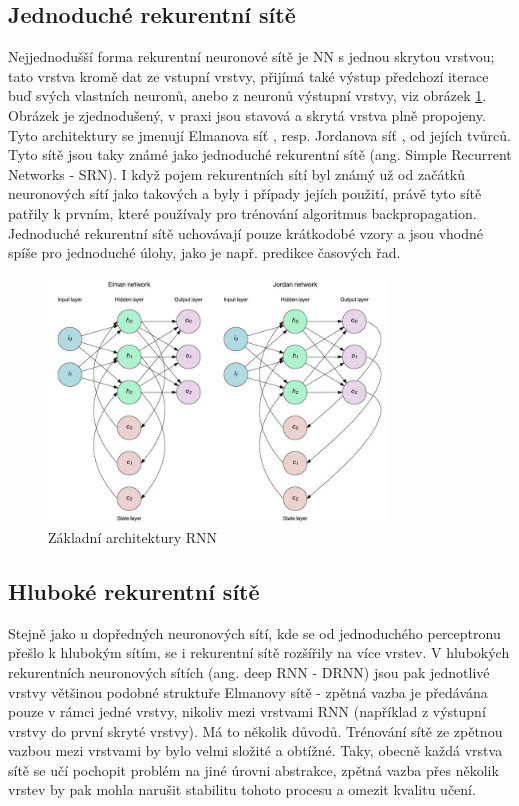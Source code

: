 \subsection{Jednoduché rekurentní sítě}

Nejjednodušší forma rekurentní neuronové sítě je NN s jednou skrytou vrstvou;
tato vrstva kromě dat ze vstupní vrstvy, přijímá také výstup předchozí iterace
buď svých vlastních neuronů, anebo z neuronů výstupní vrstvy, viz obrázek
\ref{fig:rnn}. Obrázek je zjednodušený, v praxi jsou stavová a skrytá vrstva
plně propojeny. Tyto architektury se jmenují Elmanova síť \cite{elman}, resp.
Jordanova síť \cite{jordan}, od jejích tvůrců. Tyto sítě jsou taky známé jako
jednoduché rekurentní sítě (ang. Simple Recurrent Networks - SRN). I když pojem
rekurentních sítí byl známý už od začátků neuronových sítí jako takových a byly
i případy jejích použití, právě tyto sítě patřily k prvním, které používaly pro
trénování algoritmus backpropagation. Jednoduché rekurentní sítě uchovávají
pouze krátkodobé vzory a jsou vhodné spíše pro jednoduché úlohy, jako je např.
predikce časových řad.

\begin{figure}[]
    \centering
    \includegraphics[width=0.8\textwidth]{Figures/rnn.png}
    \caption{Základní architektury RNN \cite{aksoy}}
    \label{fig:rnn}
\end{figure}

\subsection{Hluboké rekurentní sítě}

Stejně jako u dopředných neuronových sítí, kde se od jednoduchého perceptronu
přešlo k hlubokým sítím, se i rekurentní sítě rozšířily na více vrstev. V
hlubokých rekurentních neuronových sítích (ang. deep RNN - DRNN) jsou pak
jednotlivé vrstvy většinou podobné struktuře Elmanovy sítě - zpětná vazba je
předávána pouze v rámci jedné vrstvy, nikoliv mezi vrstvami RNN (například z
výstupní vrstvy do první skryté vrstvy). Má to několik důvodů. Trénování sítě
ze zpětnou vazbou mezi vrstvami by bylo velmi složité a obtížné. Taky, obecně
každá vrstva sítě se učí pochopit problém na jiné úrovni abstrakce, zpětná
vazba přes několik vrstev by pak mohla narušit stabilitu tohoto procesu a
omezit kvalitu učení.

